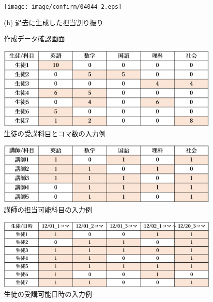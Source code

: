 \begin{figure}[htbp]
\begin{center}
\texttt{[image: image/confirm/04044\_2.eps]}

    (b) 過去に生成した担当割り振り\\
\caption{作成データ確認画面}
\label{s04044}
\end{center}
\end{figure}

\begin{figure}[htbp]
\begin{center}
\includegraphics[scale=0.5]{image/new_file/04042_1.eps}
\caption{生徒の受講科目とコマ数の入力例}
\label{i04041}
\end{center}
\end{figure}

\begin{figure}[htbp]
\begin{center}
\includegraphics[scale=0.5]{image/new_file/04042_2.eps}
\caption{講師の担当可能科目の入力例}
\label{i04042}
\end{center}
\end{figure}

\begin{figure}[htbp]
\begin{center}
\includegraphics[scale=0.5]{image/new_file/04042_3.eps}
\caption{生徒の受講可能日時の入力例}
\label{i04043}
\end{center}
\end{figure}

